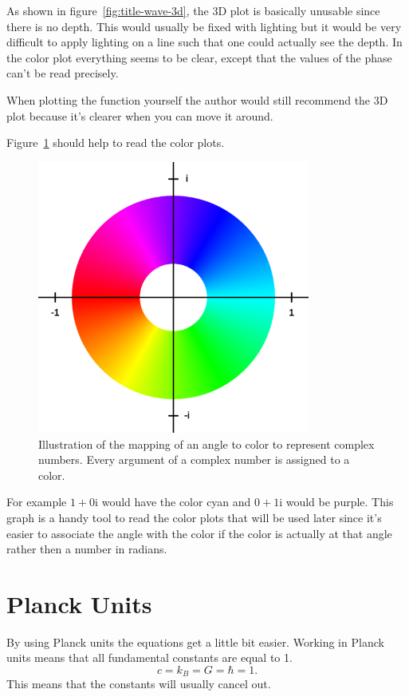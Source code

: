 \documentclass[11pt,DIV=10,final]{scrreprt} %
\newcommand{\mi}{{\text{i}}}
\begin{document}
As shown in figure~\ref{fig:title-wave-3d}, the 3D plot is basically unusable since there is no depth. This would usually be fixed with lighting but it would be very difficult to apply lighting on a line
such that one could actually see the depth. In the color plot everything seems to be clear, except that the values of the phase can't be read precisely.

When plotting the function yourself the author would still recommend the 3D plot because it's clearer when you can move it around.

Figure~\ref{fig:color-to-phase-circle} should help to read the color plots.
\begin{figure}[H]
  \centering
  \includegraphics[width=0.8\textwidth]{plots/color_circle.png}
  \caption{Illustration of the mapping of an angle to color to represent complex numbers. Every argument of a complex number is assigned to a color.}\label{fig:color-to-phase-circle}
\end{figure}
For example $1 + 0 \mi$ would have the color cyan and $0 + 1 \mi$ would be purple.
This graph is a handy tool to read the color plots that will be used later since it's easier to associate the angle with the color if the color is actually at that angle
rather then a number in radians.

\section{Planck Units}
By using Planck units the equations get a little bit easier.
Working in Planck units means that all fundamental constants are equal to 1.
\[
  c = k_{B} = G = \hbar = 1.
\]
This means that the constants will usually cancel out.
\end{document}

